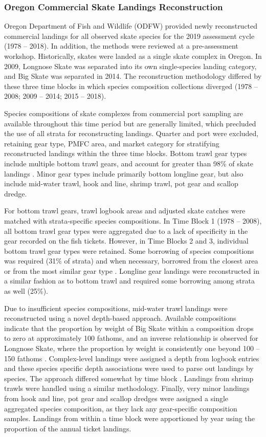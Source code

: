 \documentclass[12pt,]{article}
\begin{document}
\hypertarget{oregon-commercial-skate-landings-reconstruction}{%
\subsubsection{Oregon Commercial Skate Landings
Reconstruction}\label{oregon-commercial-skate-landings-reconstruction}}

Oregon Department of Fish and Wildlife (ODFW) provided newly
reconstructed commercial landings for all observed skate species for the
2019 assessment cycle (1978 -- 2018). In addition, the methods were
reviewed at a pre-assessment workshop. Historically, skates were landed
as a single skate complex in Oregon. In 2009, Longnose Skate was
separated into its own single-species landing category, and Big Skate
was separated in 2014. The reconstruction methodology differed by these
three time blocks in which species composition collections diverged
(1978 -- 2008; 2009 -- 2014; 2015 -- 2018).

Species compositions of skate complexes from commercial port sampling
are available throughout this time period but are generally limited,
which precluded the use of all strata for reconstructing landings.
Quarter and port were excluded, retaining gear type, PMFC area, and
market category for stratifying reconstructed landings within the three
time blocks. Bottom trawl gear types include multiple bottom trawl
gears, and account for greater than 98\% of skate landings . Minor gear
types include primarily bottom longline gear, but also include mid-water
trawl, hook and line, shrimp trawl, pot gear and scallop dredge.

For bottom trawl gears, trawl logbook areas and adjusted skate catches
were matched with strata-specific species compositions. In Time Block 1
(1978 -- 2008), all bottom trawl gear types were aggregated due to a
lack of specificity in the gear recorded on the fish tickets. However,
in Time Blocks 2 and 3, individual bottom trawl gear types were
retained. Some borrowing of species compositions was required (31\% of
strata) and when necessary, borrowed from the closest area or from the
most similar gear type . Longline gear landings were reconstructed in a
similar fashion as to bottom trawl and required some borrowing among
strata as well (25\%).

Due to insufficient species compositions, mid-water trawl landings were
reconstructed using a novel depth-based approach. Available compositions
indicate that the proportion by weight of Big Skate within a composition
drops to zero at approximately 100 fathoms, and an inverse relationship
is observed for Longnose Skate, where the proportion by weight is
consistently one beyond 100 -- 150 fathoms . Complex-level landings were
assigned a depth from logbook entries and these species specific depth
associations were used to parse out landings by species. The approach
differed somewhat by time block . Landings from shrimp trawls were
handled using a similar methodology. Finally, very minor landings from
hook and line, pot gear and scallop dredges were assigned a single
aggregated species composition, as they lack any gear-specific
composition samples. Landings from within a time block were apportioned
by year using the proportion of the annual ticket landings.
\end{document}
